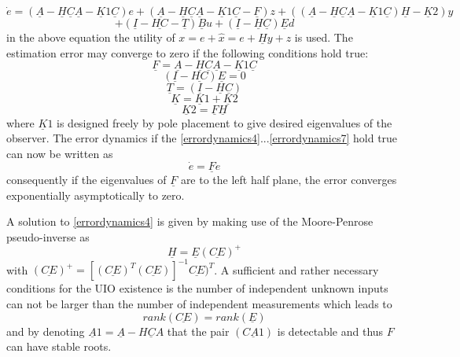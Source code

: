 %
\begin{equation}
\dot{e}= (\underline A-\underline H \underline C \underline A-\underline K1 \underline C)e + (\underline A-\underline H \underline C \underline A-\underline K1 \underline C - \underline F)z+ ((\underline A-\underline H \underline C \underline A-\underline K1 \underline C )\underline H-\underline K2)y
\label{errordynamics}
\end{equation}
\begin{equation*}
+ (\underline I - \underline {HC} - \underline T)\underline Bu	+(\underline I -\underline H\underline C)\underline E d
\label{errordynamics45}
\end{equation*}
in the above equation the utility of $x  = e + \hat{x} = e + \underline Hy+z$ is used. The estimation error may converge to zero if the following conditions hold true:
 \begin{equation}
 \underline F = \underline A-\underline H \underline C \underline A-\underline K1 \underline C
 \label{errordynamics3}
 \end{equation}
\begin{equation}
(\underline I - \underline{HC})\underline E = 0
\label{errordynamics4}
\end{equation}
\begin{equation}
\underline T = (\underline I - \underline H\underline C)
\label{errordynamics5}
\end{equation}
\begin{equation}
\underline K = \underline K1 +\underline K2
\label{errordynamics6}
\end{equation}
\begin{equation}
\underline K2 =\underline F \underline H 
\label{errordynamics7}
\end{equation}
where $\underline K1$ is designed freely by pole placement to give desired eigenvalues of the observer. The error dynamics if the \ref{errordynamics4}...\ref{errordynamics7} hold true can now be written as 
\begin{equation}
\dot{e} = \underline F e
\label{errordynamics8}
\end{equation}
consequently if the eigenvalues of $\underline F$ are to the left half plane, the error converges exponentially asymptotically to zero. 

A solution to \eqref{errordynamics4} is given by making use of the Moore-Penrose pseudo-inverse as
\begin{equation}
\underline H = \underline E (\underline{CE})^{+}
\label{errordynamics9}
\end{equation}
with $(\underline{CE})^{+} = [(\underline{CE})^{T} (\underline{CE})]^{-1}\underline{CE})^{T} $.
A sufficient and rather necessary conditions for the UIO existence is the number of independent unknown inputs can not be larger than the number of independent measurements which leads to
  \begin{equation}
  rank (\underline{CE}) =rank( \underline E) 
  \label{errordynamics10}
  \end{equation}
  and by denoting $\underline A1 = \underline A - \underline{HCA} $ that the pair $(\underline {CA1})$ is detectable and thus $F$ can have stable roots.
